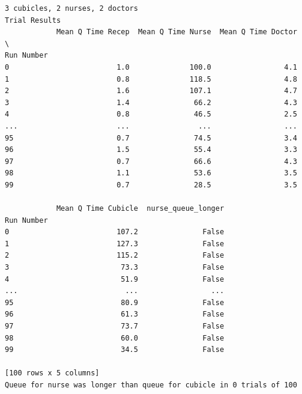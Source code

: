 \documentclass[
  letterpaper,
  DIV=11,
  numbers=noendperiod]{scrreprt}
\begin{document}
\begin{verbatim}
3 cubicles, 2 nurses, 2 doctors
Trial Results
            Mean Q Time Recep  Mean Q Time Nurse  Mean Q Time Doctor  \
Run Number                                                             
0                         1.0              100.0                 4.1   
1                         0.8              118.5                 4.8   
2                         1.6              107.1                 4.7   
3                         1.4               66.2                 4.3   
4                         0.8               46.5                 2.5   
...                       ...                ...                 ...   
95                        0.7               74.5                 3.4   
96                        1.5               55.4                 3.3   
97                        0.7               66.6                 4.3   
98                        1.1               53.6                 3.5   
99                        0.7               28.5                 3.5   

            Mean Q Time Cubicle  nurse_queue_longer  
Run Number                                           
0                         107.2               False  
1                         127.3               False  
2                         115.2               False  
3                          73.3               False  
4                          51.9               False  
...                         ...                 ...  
95                         80.9               False  
96                         61.3               False  
97                         73.7               False  
98                         60.0               False  
99                         34.5               False  

[100 rows x 5 columns]
Queue for nurse was longer than queue for cubicle in 0 trials of 100
\end{verbatim}
\end{document}
